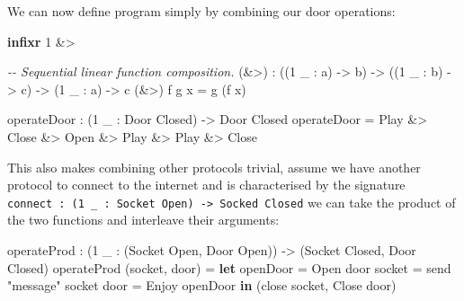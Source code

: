 \documentclass[
]{article}
\newenvironment{Shaded}{}{}
\newcommand{\CommentTok}[1]{\textcolor[rgb]{0.38,0.63,0.69}{\textit{#1}}}
\newcommand{\DataTypeTok}[1]{\textcolor[rgb]{0.56,0.13,0.00}{#1}}
\newcommand{\DecValTok}[1]{\textcolor[rgb]{0.25,0.63,0.44}{#1}}
\newcommand{\KeywordTok}[1]{\textcolor[rgb]{0.00,0.44,0.13}{\textbf{#1}}}
\newcommand{\NormalTok}[1]{#1}
\newcommand{\OperatorTok}[1]{\textcolor[rgb]{0.40,0.40,0.40}{#1}}
\newcommand{\OtherTok}[1]{\textcolor[rgb]{0.00,0.44,0.13}{#1}}
\newcommand{\StringTok}[1]{\textcolor[rgb]{0.25,0.44,0.63}{#1}}
\begin{document}
We can now define program simply by combining our door operations:

\begin{Shaded}
\begin{Highlighting}[]
\KeywordTok{infixr} \DecValTok{1} \OperatorTok{\&\textgreater{}}

\CommentTok{{-}{-} Sequential linear function composition.}
\NormalTok{(}\OperatorTok{\&\textgreater{}}\NormalTok{) }\OperatorTok{:}\NormalTok{ ((}\DecValTok{1}\NormalTok{ \_ }\OperatorTok{:}\NormalTok{ a) }\OtherTok{{-}\textgreater{}}\NormalTok{ b) }\OtherTok{{-}\textgreater{}} 
\NormalTok{       ((}\DecValTok{1}\NormalTok{ \_ }\OperatorTok{:}\NormalTok{ b) }\OtherTok{{-}\textgreater{}}\NormalTok{ c) }\OtherTok{{-}\textgreater{}} 
\NormalTok{        (}\DecValTok{1}\NormalTok{ \_ }\OperatorTok{:}\NormalTok{ a) }\OtherTok{{-}\textgreater{}}\NormalTok{ c}
\NormalTok{(}\OperatorTok{\&\textgreater{}}\NormalTok{) f g x }\OtherTok{=}\NormalTok{ g (f x)}

\NormalTok{operateDoor }\OperatorTok{:}\NormalTok{ (}\DecValTok{1}\NormalTok{ \_ }\OperatorTok{:} \DataTypeTok{Door} \DataTypeTok{Closed}\NormalTok{) }\OtherTok{{-}\textgreater{}} \DataTypeTok{Door} \DataTypeTok{Closed}
\NormalTok{operateDoor }\OtherTok{=} \DataTypeTok{Play} \OperatorTok{\&\textgreater{}} \DataTypeTok{Close} \OperatorTok{\&\textgreater{}} \DataTypeTok{Open} \OperatorTok{\&\textgreater{}} \DataTypeTok{Play} \OperatorTok{\&\textgreater{}} \DataTypeTok{Play} \OperatorTok{\&\textgreater{}} \DataTypeTok{Close}
\end{Highlighting}
\end{Shaded}

This also makes combining other protocols trivial, assume we have
another protocol to connect to the internet and is characterised by the
signature
\texttt{connect\ :\ (1\ \_\ :\ Socket\ Open)\ -\textgreater{}\ Socked\ Closed}
we can take the product of the two functions and interleave their
arguments:

\begin{Shaded}
\begin{Highlighting}[]
\NormalTok{operateProd }\OperatorTok{:}\NormalTok{ (}\DecValTok{1}\NormalTok{ \_ }\OperatorTok{:}\NormalTok{ (}\DataTypeTok{Socket} \DataTypeTok{Open}\NormalTok{, }\DataTypeTok{Door} \DataTypeTok{Open}\NormalTok{)) }
           \OtherTok{{-}\textgreater{}}\NormalTok{ (}\DataTypeTok{Socket} \DataTypeTok{Closed}\NormalTok{, }\DataTypeTok{Door} \DataTypeTok{Closed}\NormalTok{)}
\NormalTok{operateProd (socket, door) }\OtherTok{=} 
  \KeywordTok{let}\NormalTok{ openDoor }\OtherTok{=} \DataTypeTok{Open}\NormalTok{ door}
\NormalTok{      socket\textquotesingle{} }\OtherTok{=}\NormalTok{ send }\StringTok{"message"}\NormalTok{ socket}
\NormalTok{      door\textquotesingle{} }\OtherTok{=} \DataTypeTok{Enjoy}\NormalTok{ openDoor }\KeywordTok{in}
\NormalTok{      (close socket\textquotesingle{}, }\DataTypeTok{Close}\NormalTok{ door\textquotesingle{})}
\end{Highlighting}
\end{Shaded}
\end{document}

